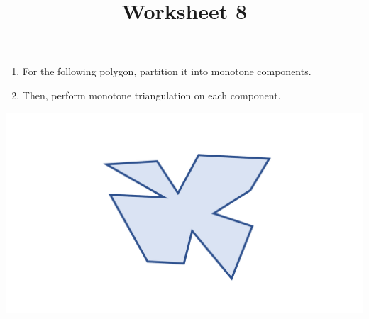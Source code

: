 \documentclass[a4paper,12pt]{article}
\title{Worksheet 8}
\begin{document}
\maketitle


\worksheetGroundRules

\worksheetSubmission

\assignmentInstructions

\begin{enumerate}

\item For the following polygon, partition it into monotone components. 
\item Then, perform monotone triangulation on each component. 

\end{enumerate}


\begin{center}
\includegraphics[width=0.75\linewidth]{../images/worksheet3.pdf}
\end{center}



\newpage
\end{document}
